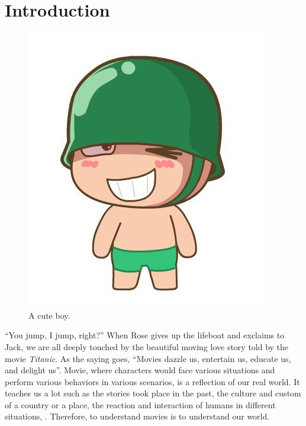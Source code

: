 
\section{Introduction}
\label{sec:p1-introduction}

\begin{figure}[t]
	\centering
	\includegraphics[width=0.5\linewidth]{paper1/figures/fig1}
	\caption{\small
		A cute boy.
	}
	\label{fig:p1-teaser}
\end{figure}



``You jump, I jump, right?'' When Rose gives up the lifeboat and exclaims to Jack, we are all deeply touched by the beautiful moving love story told by the movie \emph{Titanic}. As the saying goes, ``Movies dazzle us, entertain us, educate us, and delight us''. Movie, where characters would face various situations and perform various behaviors in various scenarios, is a reflection of our real world. It teaches us a lot such as the stories took place in the past, the culture and custom of a country or a place, the reaction and interaction of humans in different situations, \etc. Therefore, to understand movies is to understand our world.


